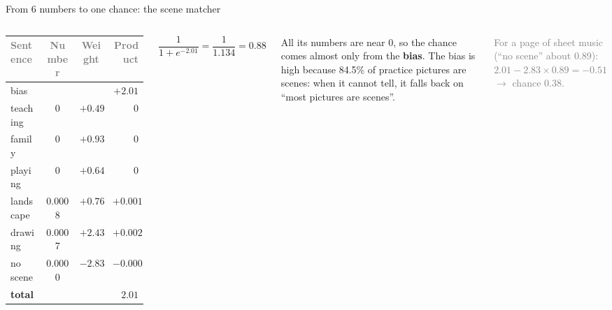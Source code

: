 \documentclass[aspectratio=169,11pt]{beamer}
\renewcommand{\arraystretch}{1.3}
\newcommand{\h}[1]{\textcolor{grey}{#1}}
\begin{document}
\begin{frame}{From 6 numbers to one chance: the scene matcher}
\begin{columns}[T]
\footnotesize\renewcommand{\arraystretch}{1.12}
\begin{tabular}{@{}l c c r@{}}
\toprule
\h{Sentence} & \h{Number} & \h{Weight} & \h{Product}\\
\midrule
bias & & & $+2.01$\\
teaching & 0 & $+0.49$ & 0\\
family & 0 & $+0.93$ & 0\\
playing & 0 & $+0.64$ & 0\\
landscape & 0.0008 & $+0.76$ & $+0.001$\\
drawing & 0.0007 & $+2.43$ & $+0.002$\\
no scene & 0.0000 & $-2.83$ & $-0.000$\\
\midrule
\textbf{total} & & & $\mathbf{2.01}$\\
\bottomrule
\end{tabular}
\[ \frac{1}{1 + e^{-2.01}} = \frac{1}{1.134} = \mathbf{0.88} \]

\vspace{0.2cm}
All its numbers are near 0, so the chance comes almost only from the \textbf{bias}. The bias is high because 84.5\% of practice pictures are scenes: when it cannot tell, it falls back on ``most pictures are scenes''.

\vspace{0.2cm}
\textcolor{grey}{For a page of sheet music (``no scene'' about 0.89): $2.01 - 2.83 \times 0.89 = -0.51$ $\to$ chance 0.38.}
\end{columns}
\end{frame}
\end{document}
